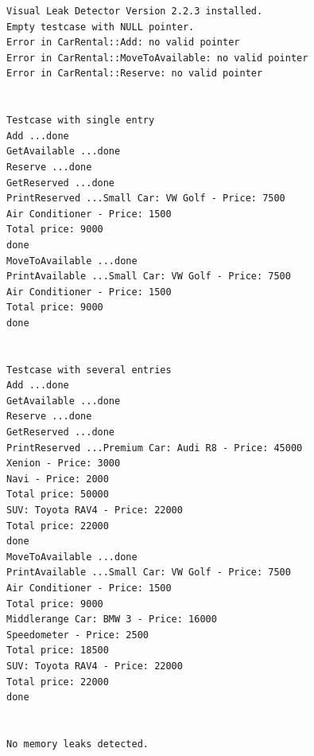 \documentclass[12pt,a4paper]{article}
\begin{document}
\begin {verbatim}
Visual Leak Detector Version 2.2.3 installed.
Empty testcase with NULL pointer.
Error in CarRental::Add: no valid pointer
Error in CarRental::MoveToAvailable: no valid pointer
Error in CarRental::Reserve: no valid pointer


Testcase with single entry
Add ...done
GetAvailable ...done
Reserve ...done
GetReserved ...done
PrintReserved ...Small Car: VW Golf - Price: 7500
Air Conditioner - Price: 1500
Total price: 9000
done
MoveToAvailable ...done
PrintAvailable ...Small Car: VW Golf - Price: 7500
Air Conditioner - Price: 1500
Total price: 9000
done


Testcase with several entries
Add ...done
GetAvailable ...done
Reserve ...done
GetReserved ...done
PrintReserved ...Premium Car: Audi R8 - Price: 45000
Xenion - Price: 3000
Navi - Price: 2000
Total price: 50000
SUV: Toyota RAV4 - Price: 22000
Total price: 22000
done
MoveToAvailable ...done
PrintAvailable ...Small Car: VW Golf - Price: 7500
Air Conditioner - Price: 1500
Total price: 9000
Middlerange Car: BMW 3 - Price: 16000
Speedometer - Price: 2500
Total price: 18500
SUV: Toyota RAV4 - Price: 22000
Total price: 22000
done


No memory leaks detected.
\end {verbatim}
\end{document}
